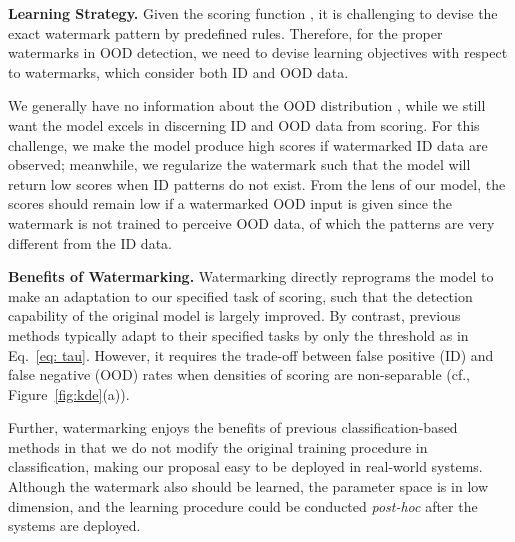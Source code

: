 \documentclass{article}
\begin{document}
\textbf{Learning Strategy.} Given the scoring function , it is challenging to devise the exact watermark pattern by predefined rules. Therefore, for the proper watermarks in OOD detection, we need to devise learning objectives with respect to watermarks, which consider both ID and OOD data. 

{We generally have no information about the OOD distribution , while we still want the model excels in discerning ID and OOD data from scoring. For this challenge, we make the model produce high scores if watermarked ID data are observed; meanwhile, we regularize the watermark such that the model will return low scores when ID patterns do not exist. From the lens of our model, the scores should remain low if a watermarked OOD input is given since the watermark is not trained to perceive OOD data, of which the patterns are very different from the ID data.}









\textbf{Benefits of Watermarking.} Watermarking directly reprograms the model to make an adaptation to our specified task of scoring, such that the detection capability of the original model is largely improved. By contrast, previous methods typically adapt to their specified tasks by only the threshold  as in Eq.~\eqref{eq: tau}. However, it requires the trade-off between false positive (ID) and false negative (OOD) rates when densities of scoring are non-separable (cf., Figure~\ref{fig:kde}(a)). 

Further, watermarking enjoys the benefits of previous classification-based methods in that we do not modify the original training procedure in classification, making our proposal easy to be deployed in real-world systems. Although the watermark also should be learned, the parameter space is in low dimension, and the learning procedure could be conducted \emph{post-hoc} after the systems are deployed. 
\end{document}
